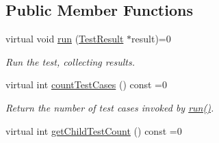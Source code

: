 \subsection*{Public Member Functions}
\begin{DoxyCompactItemize}
\item 
\hypertarget{class_test_a7beeb95dc0d058bd3bfea1a75463cb03}{virtual void \hyperlink{class_test_a7beeb95dc0d058bd3bfea1a75463cb03}{run} (\hyperlink{class_test_result}{Test\-Result} $\ast$result)=0}\label{class_test_a7beeb95dc0d058bd3bfea1a75463cb03}

\begin{DoxyCompactList}\small\item\em Run the test, collecting results. \end{DoxyCompactList}\item 
virtual int \hyperlink{class_test_aad2b7244c7cec3f3aa9f81d12b15c8cf}{count\-Test\-Cases} () const =0
\begin{DoxyCompactList}\small\item\em Return the number of test cases invoked by \hyperlink{class_test_a7beeb95dc0d058bd3bfea1a75463cb03}{run()}. \end{DoxyCompactList}\item 
\hypertarget{class_test_a7aaab95037b7222573471074c56df85b}{virtual int \hyperlink{class_test_a7aaab95037b7222573471074c56df85b}{get\-Child\-Test\-Count} () const =0}\label{class_test_a7aaab95037b7222573471074c56df85b}


\end{DoxyCompactItemize}
